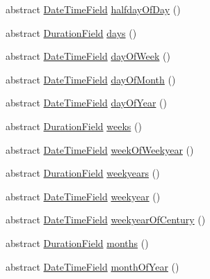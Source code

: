 \begin{DoxyCompactItemize}
abstract \hyperlink{classorg_1_1joda_1_1time_1_1_date_time_field}{Date\-Time\-Field} \hyperlink{classorg_1_1joda_1_1time_1_1_chronology_a947b3d7f2701d4ccc8ad50a4e9a34ee0}{halfday\-Of\-Day} ()
\item 
abstract \hyperlink{classorg_1_1joda_1_1time_1_1_duration_field}{Duration\-Field} \hyperlink{classorg_1_1joda_1_1time_1_1_chronology_a743598c05791b9b50bfed3f806989df1}{days} ()
\item 
abstract \hyperlink{classorg_1_1joda_1_1time_1_1_date_time_field}{Date\-Time\-Field} \hyperlink{classorg_1_1joda_1_1time_1_1_chronology_aa37fa179cefe9a090f3d2be9c3bd93e2}{day\-Of\-Week} ()
\item 
abstract \hyperlink{classorg_1_1joda_1_1time_1_1_date_time_field}{Date\-Time\-Field} \hyperlink{classorg_1_1joda_1_1time_1_1_chronology_a1b308ac0dfcc5b96a51dc97320bf3191}{day\-Of\-Month} ()
\item 
abstract \hyperlink{classorg_1_1joda_1_1time_1_1_date_time_field}{Date\-Time\-Field} \hyperlink{classorg_1_1joda_1_1time_1_1_chronology_a61f01f073f2b9c6f1f92fdf07168a8b2}{day\-Of\-Year} ()
\item 
abstract \hyperlink{classorg_1_1joda_1_1time_1_1_duration_field}{Duration\-Field} \hyperlink{classorg_1_1joda_1_1time_1_1_chronology_a864946a3b534b63d6475646e8386bbd8}{weeks} ()
\item 
abstract \hyperlink{classorg_1_1joda_1_1time_1_1_date_time_field}{Date\-Time\-Field} \hyperlink{classorg_1_1joda_1_1time_1_1_chronology_a1c0a9916a8e70ddebee069f0942a7820}{week\-Of\-Weekyear} ()
\item 
abstract \hyperlink{classorg_1_1joda_1_1time_1_1_duration_field}{Duration\-Field} \hyperlink{classorg_1_1joda_1_1time_1_1_chronology_a0be336f8ac933885fb56ea225090bc79}{weekyears} ()
\item 
abstract \hyperlink{classorg_1_1joda_1_1time_1_1_date_time_field}{Date\-Time\-Field} \hyperlink{classorg_1_1joda_1_1time_1_1_chronology_aea591a0315e6832f9a8cb9729b43d8f3}{weekyear} ()
\item 
abstract \hyperlink{classorg_1_1joda_1_1time_1_1_date_time_field}{Date\-Time\-Field} \hyperlink{classorg_1_1joda_1_1time_1_1_chronology_a4a49b7aafeb4a61aea43af23e9f26fd0}{weekyear\-Of\-Century} ()
\item 
abstract \hyperlink{classorg_1_1joda_1_1time_1_1_duration_field}{Duration\-Field} \hyperlink{classorg_1_1joda_1_1time_1_1_chronology_a4d506ee56ee3d861f31faf25608ac815}{months} ()
\item 
abstract \hyperlink{classorg_1_1joda_1_1time_1_1_date_time_field}{Date\-Time\-Field} \hyperlink{classorg_1_1joda_1_1time_1_1_chronology_ad681295b93c8743ccdd5070ec3e03c8a}{month\-Of\-Year} ()

\end{DoxyCompactItemize}
